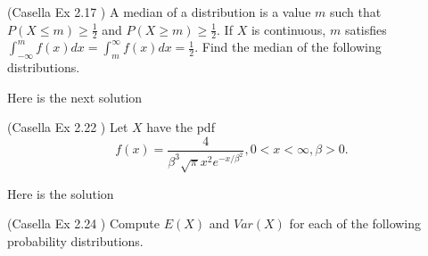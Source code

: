 \documentclass[12pt,letterpaper]{exam}
\begin{document}
\begin{questions}
	\setcounter{question}{16}
	\question  (Casella Ex 2.17 ) A median of a distribution is a value $m$ such that $P(X \le m) \ge \frac{1}{2}$ and $P(X \ge m) \ge \frac{1}{2}$.
	If $X$ is continuous, $m$ satisfies $\int_{-\infty}^{m} f(x) dx = \int_{m}^{\infty} f(x) dx = \frac{1}{2}$. Find the median of the following distributions.
	
	\begin{solution}
		Here is the next solution
	\end{solution}

	\setcounter{question}{21}
	\question (Casella Ex 2.22 ) Let $X$ have the pdf $$ f(x) = \frac{4}{\beta^3\sqrt{\pi} x^2 e^{-x/\beta^2}}, 0 < x < \infty, \beta > 0.$$
	
	\begin{solution}
		Here is the solution
	\end{solution}
	
	\setcounter{question}{23}
	\question  (Casella Ex 2.24 ) Compute $E(X)$ and $Var(X)$ for each of the following probability distributions.
\end{questions}
\end{document}
